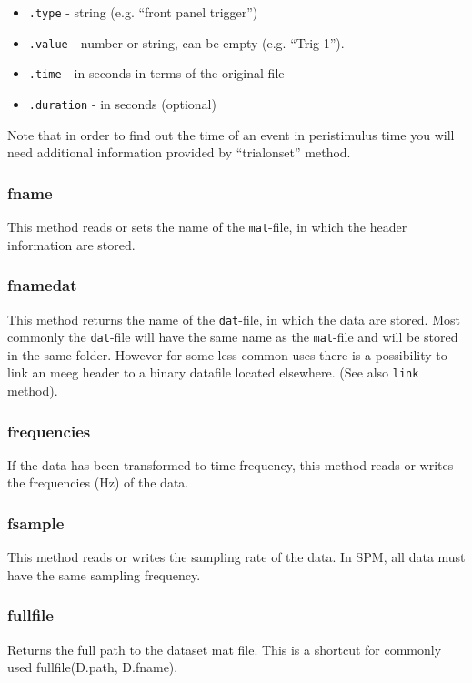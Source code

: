 \begin{itemize}
\item \texttt{.type} - string (e.g. ``front panel trigger'')
\item \texttt{.value} - number or string, can be empty (e.g. ``Trig 1'').
\item \texttt{.time} - in seconds in terms of the original file
\item \texttt{.duration} - in seconds (optional)
\end{itemize}

Note that in order to find out the time of an event in peristimulus time you will need additional information provided by ``trialonset'' method.

\subsubsection{fname}
This method reads or sets the name of the \texttt{mat}-file, in which the header information are stored.

\subsubsection{fnamedat}
This method returns the name of the \texttt{dat}-file, in which the data are stored. Most commonly the \texttt{dat}-file will have the same name as the \texttt{mat}-file and will be stored in the same folder. However for some less common uses there is a possibility to link an meeg header to a binary datafile located elsewhere. (See also \texttt{link} method).

\subsubsection{frequencies}
If the data has been transformed to time-frequency, this method reads or writes the frequencies (Hz) of the data.

\subsubsection{fsample}
This method reads or writes the sampling rate of the data. In SPM, all data must have the same sampling frequency.

\subsubsection{fullfile}
Returns the full path to the dataset mat file. This is a shortcut for commonly used fullfile(D.path, D.fname).

